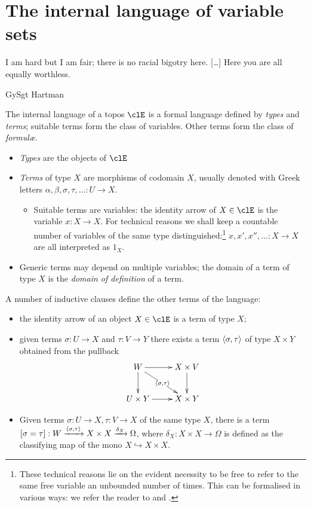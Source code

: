 \section{The internal language of variable sets}\label{int_lang}
\epigraph{I am hard but I am fair; there is no racial bigotry here. [\dots\unkern] Here you are all equally worthless.}{GySgt Hartman}
\begin{definition}\label{da_lang}
	The internal language of a topos $\clE$ is a formal language defined by \emph{types} and \emph{terms}; suitable terms form the class of variables. Other terms form the class of \emph{formul\ae}.
	\begin{itemize}
		\item \emph{Types} are the objects of $\clE$
		\item \emph{Terms} of type $X$ are morphisms of codomain $X$, usually denoted with Greek letters $\alpha,\beta,\sigma,\tau ,\ldots : U \to X$.
		      \begin{itemize}
			      \item Suitable terms are variables: the identity arrow of $X\in\clE$ is the variable  $x : X \to X$. For technical reasons we shall keep a countable number of variables of the same type distinguished:\footnote{These technical reasons lie on the evident necessity to be free to refer to the same free variable an unbounded number of times. This can be formalised in various ways: we refer the reader to \cite{lambek1988introduction} and \cite{JohnstonePT}.} $x,x',x'',\ldots : X \to X$ are all interpreted as $1_X$.
		      \end{itemize}
		\item Generic terms may depend on multiple variables; the domain of a term of type $X$ is the \emph{domain of definition} of a term.
	\end{itemize}
	A number of inductive clauses define the other terms of the language:
	\begin{itemize}
		\item the identity arrow of an object $X\in\clE$ is a term of type $X$;
		\item given terms $\sigma : U \to X$ and $\tau :  V\to Y$ there exists a term $\langle \sigma,\tau\rangle$ of type $X\times Y$ obtained from the pullback
		      \[\xymatrix{
			      W \ar[d]\ar[r]\ar[dr]|{\lr{\sigma}{\tau}} & X \times V \ar[d]\\
			      U\times Y \ar[r]& X\times Y
			      }\]
		\item Given terms $\sigma : U \to X, \tau : V \to X$ of the same type $X$, there is a term $[\sigma = \tau] : W \xrightarrow{\langle \sigma,\tau\rangle} X\times X \xrightarrow{\delta_X} \Omega$, where $\delta_X : X\times X \to \Omega$ is defined as the classifying map of the mono $X \hookrightarrow X\times X$.

\end{itemize}
\end{definition}
